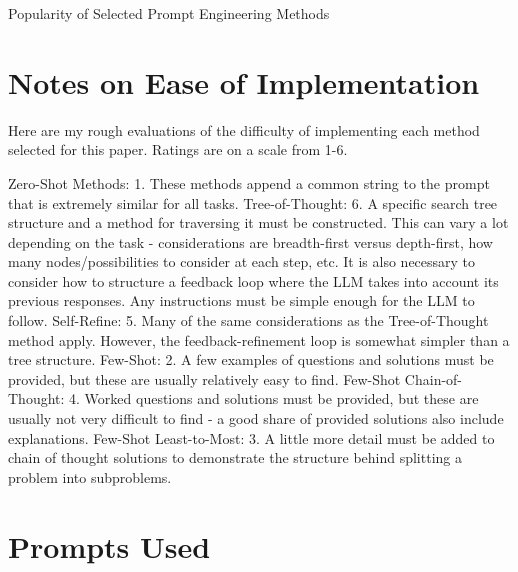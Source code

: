 \documentclass[11pt]{article}
\begin{document}
\begin{landscape}

  \begin{centering}

    \begin{table}[h]
      \caption{Popularity of Selected Prompt Engineering Methods}
      \small
      
      \label{tab:method_pop}
    \end{table}

  \end{centering}

\end{landscape}

\section{Notes on Ease of Implementation}

Here are my rough evaluations of the difficulty of implementing each method selected for this paper. Ratings are on a scale from 1-6.

Zero-Shot Methods: 1. These methods append a common string to the prompt that is extremely similar for all tasks.
Tree-of-Thought: 6. A specific search tree structure and a method for traversing it must be constructed. This can vary a lot depending on the task - considerations are breadth-first versus depth-first, how many nodes/possibilities to consider at each step, etc. It is also necessary to consider how to structure a feedback loop where the LLM takes into account its previous responses. Any instructions must be simple enough for the LLM to follow.
Self-Refine: 5. Many of the same considerations as the Tree-of-Thought method apply. However, the feedback-refinement loop is somewhat simpler than a tree structure.
Few-Shot: 2. A few examples of questions and solutions must be provided, but these are usually relatively easy to find.
Few-Shot Chain-of-Thought: 4. Worked questions and solutions must be provided, but these are usually not very difficult to find - a good share of provided solutions also include explanations.
Few-Shot Least-to-Most: 3. A little more detail must be added to chain of thought solutions to demonstrate the structure behind splitting a problem into subproblems.

\section{Prompts Used}
\label{sec:prompts}
\end{document}
